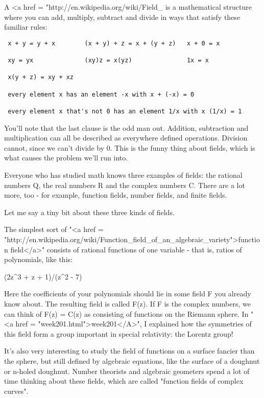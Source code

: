 A <a href = "http://en.wikipedia.org/wiki/Field_%
is a mathematical structure where you can add, multiply,
subtract and divide in ways that satisfy these familiar rules:

\begin{verbatim}
 x + y = y + x        (x + y) + z = x + (y + z)   x + 0 = x

 xy = yx              (xy)z = x(yz)               1x = x

 x(y + z) = xy + xz 

 every element x has an element -x with x + (-x) = 0
 
 every element x that's not 0 has an element 1/x with x (1/x) = 1
\end{verbatim}
    

You'll note that the last clause is the odd man out.  Addition,
subtraction and multiplication can all be described as everywhere
defined operations.  Division cannot, since we can't divide by 0.
This is the funny thing about fields, which is what causes the 
problem we'll run into.

Everyone who has studied math knows three examples of fields: 
the rational numbers Q, the real numbers R and the complex numbers C.  
There are a lot more, too - for example, function fields, number
fields, and finite fields.  

Let me say a tiny bit about these three kinds of fields.

The simplest sort of "<a href =
"http://en.wikipedia.org/wiki/Function_field_of_an_algebraic_variety">function
field</a>" consists of rational functions of one variable - that
is, ratios of polynomials, like this:

(2z^{3} + z + 1)/(z^{2} - 7)

Here the coefficients of your polynomials should lie in some field F
you already know about.  The resulting field is called F(z).  If F is
the complex numbers, we can think of F(z) = C(z) as consisting of
functions on the Riemann sphere.  In "<a href =
"week201.html">week201</A>", I explained how the symmetries of
this field form a group important in special relativity: the Lorentz
group!

It's also very interesting to study the field of functions on a
surface fancier than the sphere, but still defined by algebraic 
equations, like the surface of a doughnut or n-holed doughnut.  
Number theorists and  algebraic geometers spend a lot of time 
thinking about these fields, which are called "function fields 
of complex curves".  

